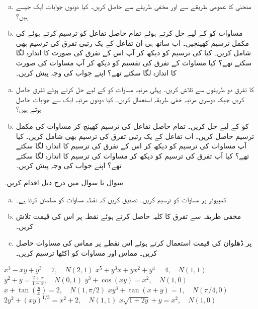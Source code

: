 \begin{enumerate}[a.]

\item
منحنی  کا  عمومی طریقے سے  اور مخفی طریقے سے حاصل کریں۔ کیا دونوں جوابات ایک   جیسے ہیں؟
\item
مساوات  کو  کے لیے حل کرتے ہوئے تمام حاصل تفاعل کو ترسیم کرتے ہوئے  کی مکمل ترسیم کھینچیں۔ اب ساتھ ہی ان تفاعل کے یک رتبی تفرق کی ترسیم بھی شامل کریں۔ کیا  کی ترسیم کو دیکھ کر آپ اس کے تفرق کی صورت کا اندازہ لگا سکتے تھے؟ کیا مساوات کے تفرق کی تقسیم کو دیکھ کر آپ مساوات کی صورت کا اندازہ لگا سکتے تھے؟ اپنے جواب کی وجہ پیش کریں۔
\end{enumerate}
\begin{enumerate}[a.]

\item
{} کا تفرق  دو طریقوں سے تلاش کریں۔ پہلی  مرتبہ مساوات کو  کے لیے حل کرتے ہوئے تفرق حاصل کریں جبکہ دوسری  مرتبہ   خفی طریقہ استعمال کریں۔ کیا دونوں  مرتبہ  ایک  سے  جوابات حاصل ہوتے ہیں؟
\item
{} کو  کے لیے حل کریں۔ تمام حاصل تفاعل کی ترسیم کھینچ کر مساوات  کی مکمل ترسیم حاصل کریں۔ اب تفاعل کے یک رتبی تفرق کی  ترسیم بھی شامل کریں۔ کیا آپ مساوات کی ترسیم کو دیکھ کر اس کے تفرق کی ترسیم کا اندازہ لگا سکتے تھے؟ کیا آپ تفرق کی ترسیم کو دیکھ کر مساوات کی ترسیم کا اندازہ لگا سکتے تھے؟ اپنے جواب کی وجہ پیش کریں۔
\end{enumerate}
سوال  تا سوال  میں درج ذیل اقدام کریں۔
\begin{enumerate}[a.]

\item
کمپیوٹر پر مساوات کو ترسیم کریں۔ تصدیق کریں کہ نقطہ  مساوات کو مطمئن کرتا ہے۔
\item
مخفی طریقہ سے تفرق  کا کلیہ حاصل کرتے ہوئے نقطہ  پر اس  کی قیمت تلاش کریں۔
\item
{} پر ڈھلوان کی قیمت استعمال کرتے ہوئے اس نقطے پر مماس کی مساوات حاصل کریں۔ مماس اور مساوات کو اکٹھا ترسیم کریں۔
\end{enumerate}


$x^3-xy+y^3=7,\quad N(2,1)$
$x^5+y^3x+yx^2+y^4=4,\quad N(1,1)$
$y^2+y=\tfrac{2+x}{1-x},\quad N(0,1)$
$y^3+\cos (xy)=x^2,\quad N(1,0)$
$x+\tan(\tfrac{y}{x})=2,\quad N(1,\pi/2)$
$xy^3+\tan(x+y)=1,\quad N(\pi/4,0)$
$2y^2+(xy)^{1/3}=x^2+2,\quad N(1,1)$
$x\sqrt{1+2y}+y=x^2,\quad N(1,0)$

